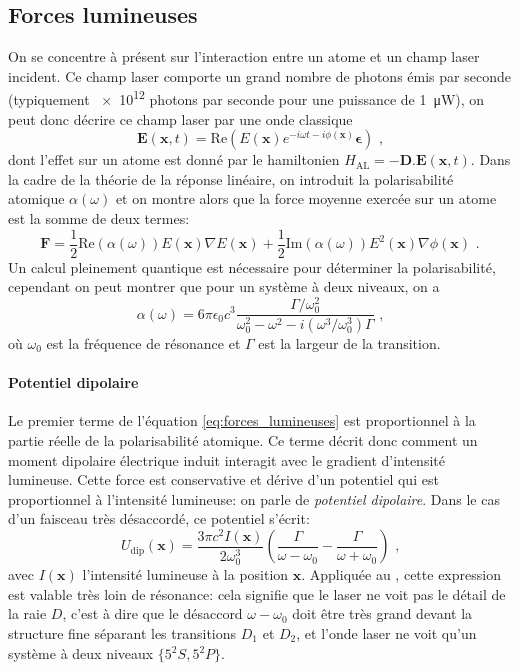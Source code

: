 \subsection{Forces lumineuses}
\label{sc:forces_lumineuses}
On se concentre à présent sur l'interaction entre un atome et un champ laser incident. Ce champ laser comporte un grand nombre de photons émis par seconde (typiquement \num{e12} photons par seconde pour une puissance de \SI{1}{\micro\watt}), on peut donc décrire ce champ laser par une onde classique 
\begin{equation}
\mathbf{E}(\mathbf{x},t)= \mathrm{Re} \left( E(\mathbf{x}) e^{-i \omega t - i\phi (\mathbf{x})}  \boldsymbol\epsilon \right) \text{ ,}
\end{equation}
dont l'effet sur un atome est donné par le hamiltonien $H_{\mathrm{AL}}=-\mathbf{D}.\mathbf{E}(\mathbf{x},t)$. 
Dans la cadre de la théorie de la réponse linéaire, on introduit la polarisabilité atomique $\alpha(\omega)$ et on montre alors que la force moyenne exercée sur un atome est la somme de deux termes:
\begin{equation}
\mathbf{F}=\frac{1}{2} \mathrm{Re}(\alpha(\omega)) E(\mathbf{x}) \nabla E(\mathbf{x})+\frac{1}{2}\mathrm{Im}(\alpha(\omega)) E^2(\mathbf{x}) \nabla \phi(\mathbf{x}) \text{ .}
\label{eq:forces_lumineuses}
\end{equation}
Un calcul pleinement quantique est nécessaire pour déterminer la polarisabilité, cependant on peut montrer que pour un système à deux niveaux, on a \citep{grimm1999optical}
\begin{equation}
\alpha(\omega)=6 \pi \epsilon_0 c^3 \frac{\Gamma / \omega_0^2}{\omega_0^2 -\omega^2 -i(\omega^3/\omega_0^3)\Gamma} \text{ ,}
\end{equation}
où $\omega_0$ est la fréquence de résonance et $\Gamma$ est la largeur de la transition.

\paragraph*{Potentiel dipolaire}
Le premier terme de l'équation \ref{eq:forces_lumineuses} est proportionnel à la partie réelle de la polarisabilité atomique. Ce terme décrit donc comment un moment dipolaire électrique induit interagit avec le gradient d'intensité lumineuse. Cette force est conservative et dérive d'un potentiel qui est proportionnel à l'intensité lumineuse: on parle de \emph{potentiel dipolaire}. Dans le cas d'un faisceau très désaccordé, ce potentiel s'écrit:
\begin{equation}
U_{\mathrm{dip}}(\mathbf{x})=\frac{3\pi c^2 I(\mathbf{x})}{2 \omega_0^3} \left( \frac{\Gamma}{\omega - \omega_0} - \frac{\Gamma}{\omega + \omega_0} \right) \text{ ,}
\label{eq:potentiel_dipolaire}
\end{equation}
avec $I(\mathbf{x})$ l'intensité lumineuse à la position $\mathbf{x}$. Appliquée au , cette expression est valable très loin de résonance: cela signifie que le laser ne voit pas le détail de la raie $D$, c'est à dire que le désaccord $\omega-\omega_0$ doit être très grand devant la structure fine séparant les transitions $D_1$ et $D_2$, et l'onde laser ne voit qu'un système à deux niveaux $\lbrace 5 {}^2S, 5 {}^2P \rbrace$.

